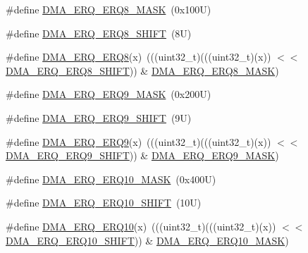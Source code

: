 \begin{DoxyCompactItemize}
\#define \mbox{\hyperlink{group___d_m_a___register___masks_gabe80002471e36dbd6e1a27090d624f6b}{D\+M\+A\+\_\+\+E\+R\+Q\+\_\+\+E\+R\+Q8\+\_\+\+M\+A\+SK}}~(0x100\+U)
\item 
\#define \mbox{\hyperlink{group___d_m_a___register___masks_ga48a71e6a1093b78a98f717f3276cf92c}{D\+M\+A\+\_\+\+E\+R\+Q\+\_\+\+E\+R\+Q8\+\_\+\+S\+H\+I\+FT}}~(8\+U)
\item 
\#define \mbox{\hyperlink{group___d_m_a___register___masks_ga0e93b0250e66f0b77def6bc30f39a213}{D\+M\+A\+\_\+\+E\+R\+Q\+\_\+\+E\+R\+Q8}}(x)~(((uint32\+\_\+t)(((uint32\+\_\+t)(x)) $<$$<$ \mbox{\hyperlink{group___d_m_a___register___masks_ga48a71e6a1093b78a98f717f3276cf92c}{D\+M\+A\+\_\+\+E\+R\+Q\+\_\+\+E\+R\+Q8\+\_\+\+S\+H\+I\+FT}})) \& \mbox{\hyperlink{group___d_m_a___register___masks_gabe80002471e36dbd6e1a27090d624f6b}{D\+M\+A\+\_\+\+E\+R\+Q\+\_\+\+E\+R\+Q8\+\_\+\+M\+A\+SK}})
\item 
\#define \mbox{\hyperlink{group___d_m_a___register___masks_gad0923ec11fdccd44e96f940f5c106ff7}{D\+M\+A\+\_\+\+E\+R\+Q\+\_\+\+E\+R\+Q9\+\_\+\+M\+A\+SK}}~(0x200\+U)
\item 
\#define \mbox{\hyperlink{group___d_m_a___register___masks_ga3d34d5c9d689bbb439ddcf01938823d1}{D\+M\+A\+\_\+\+E\+R\+Q\+\_\+\+E\+R\+Q9\+\_\+\+S\+H\+I\+FT}}~(9\+U)
\item 
\#define \mbox{\hyperlink{group___d_m_a___register___masks_ga8a137a4bac9b842443a98f669e339046}{D\+M\+A\+\_\+\+E\+R\+Q\+\_\+\+E\+R\+Q9}}(x)~(((uint32\+\_\+t)(((uint32\+\_\+t)(x)) $<$$<$ \mbox{\hyperlink{group___d_m_a___register___masks_ga3d34d5c9d689bbb439ddcf01938823d1}{D\+M\+A\+\_\+\+E\+R\+Q\+\_\+\+E\+R\+Q9\+\_\+\+S\+H\+I\+FT}})) \& \mbox{\hyperlink{group___d_m_a___register___masks_gad0923ec11fdccd44e96f940f5c106ff7}{D\+M\+A\+\_\+\+E\+R\+Q\+\_\+\+E\+R\+Q9\+\_\+\+M\+A\+SK}})
\item 
\#define \mbox{\hyperlink{group___d_m_a___register___masks_gaf424f1dea25ca2ed40884f2b9db178de}{D\+M\+A\+\_\+\+E\+R\+Q\+\_\+\+E\+R\+Q10\+\_\+\+M\+A\+SK}}~(0x400\+U)
\item 
\#define \mbox{\hyperlink{group___d_m_a___register___masks_ga793d626130cfe448e0fcfa1379575bbc}{D\+M\+A\+\_\+\+E\+R\+Q\+\_\+\+E\+R\+Q10\+\_\+\+S\+H\+I\+FT}}~(10\+U)
\item 
\#define \mbox{\hyperlink{group___d_m_a___register___masks_ga29ae93f3785e26dffc669e6a4b02b7a5}{D\+M\+A\+\_\+\+E\+R\+Q\+\_\+\+E\+R\+Q10}}(x)~(((uint32\+\_\+t)(((uint32\+\_\+t)(x)) $<$$<$ \mbox{\hyperlink{group___d_m_a___register___masks_ga793d626130cfe448e0fcfa1379575bbc}{D\+M\+A\+\_\+\+E\+R\+Q\+\_\+\+E\+R\+Q10\+\_\+\+S\+H\+I\+FT}})) \& \mbox{\hyperlink{group___d_m_a___register___masks_gaf424f1dea25ca2ed40884f2b9db178de}{D\+M\+A\+\_\+\+E\+R\+Q\+\_\+\+E\+R\+Q10\+\_\+\+M\+A\+SK}})
$$
\end{DoxyCompactItemize}

